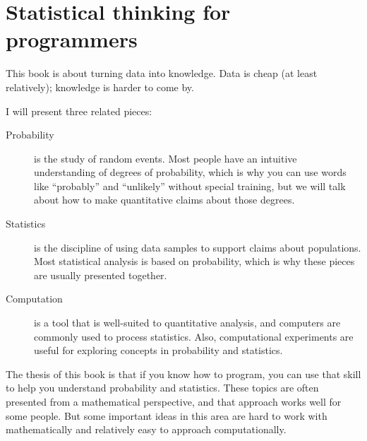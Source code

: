 \documentclass[12pt]{book}
\begin{document}
\normalsize

\clearemptydoublepage

\begin{latexonly}

\tableofcontents

\clearemptydoublepage

\end{latexonly}

\mainmatter


\chapter{Statistical thinking for programmers}
\label{intro}

This book is about turning data into knowledge.  Data is cheap (at
least relatively); knowledge is harder to come by.

I will present three related pieces:

\begin{description}

\item[Probability] is the study of random events.  Most people have an
  intuitive understanding of degrees of probability, which is why you
  can use words like ``probably'' and ``unlikely'' without special
  training, but we will talk about how to make quantitative claims
  about those degrees.

\item[Statistics] is the discipline of using data samples to support
  claims about populations.  Most statistical analysis is based on
  probability, which is why these pieces are usually presented
  together.

\item[Computation] is a tool that is well-suited to quantitative
  analysis, and computers are commonly used to process statistics.
  Also, computational experiments
  are useful for exploring concepts in probability and statistics.

\end{description}

The thesis of this book is that if you know how to program, you can
use that skill to help you understand probability and statistics.
These topics are often presented from a mathematical perspective, and
that approach works well for some people.  But some important ideas
in this area are hard to work with mathematically and relatively
easy to approach computationally.
\end{document}
